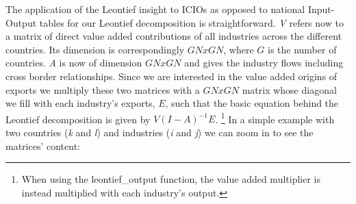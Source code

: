 \documentclass[a4paper,11pt]{article}
\begin{document}
The application of the Leontief insight to ICIOs as opposed to national Input-Output tables for our Leontief decomposition is straightforward. \textit{V} refers now to a matrix of direct value added contributions of all industries across the different countries.  Its dimension is correspondingly $GN x GN$, where $G$ is the number of countries. \textit{A} is now of dimension $GN x GN$ and gives the industry flows including cross border relationships. Since we are interested in the value added origins of exports we multiply these two matrices with a $GN x GN$ matrix whose diagonal we fill with each industry's exports, $E$, such that the basic equation behind the Leontief decomposition is given by $V(I-A)^{-1}E$. \footnote{When using the leontief\_output function, the value added multiplier is instead multiplied with each industry's output.} In a simple example with two countries (\textit{k} and \textit{l}) and industries (\textit{i} and \textit{j}) we can zoom in to see the matrices' content:
\end{document}
